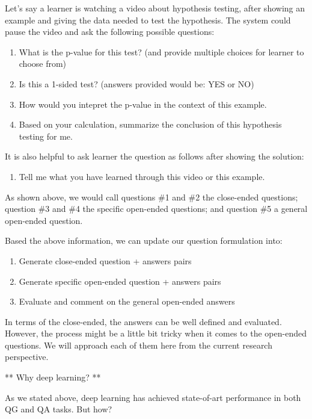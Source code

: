 \documentclass[]{book}
\providecommand{\tightlist}{%
  \setlength{\itemsep}{0pt}\setlength{\parskip}{0pt}}
\theoremstyle{definition}
\theoremstyle{definition}
\theoremstyle{definition}
\theoremstyle{remark}
\begin{document}
Let's say a learner is watching a video about hypothesis testing, after
showing an example and giving the data needed to test the hypothesis.
The system could pause the video and ask the following possible
questions:

\begin{enumerate}
\def\labelenumi{\arabic{enumi}.}
\item
  What is the p-value for this test? (and provide multiple choices for
  learner to choose from)
\item
  Is this a 1-sided test? (answers provided would be: YES or NO)
\item
  How would you intepret the p-value in the context of this example.
\item
  Based on your calculation, summarize the conclusion of this hypothesis
  testing for me.
\end{enumerate}

It is also helpful to ask learner the question as follows after showing
the solution:

\begin{enumerate}
\def\labelenumi{\arabic{enumi}.}
\setcounter{enumi}{4}
\tightlist
\item
  Tell me what you have learned through this video or this example.
\end{enumerate}

As shown above, we would call questions \#1 and \#2 the close-ended
questions; question \#3 and \#4 the specific open-ended questions; and
question \#5 a general open-ended question.

Based the above information, we can update our question formulation
into:

\begin{enumerate}
\def\labelenumi{\arabic{enumi}.}
\item
  Generate close-ended question + answers pairs
\item
  Generate specific open-ended question + answers pairs
\item
  Evaluate and comment on the general open-ended answers
\end{enumerate}

In terms of the close-ended, the answers can be well defined and
evaluated. However, the process might be a little bit tricky when it
comes to the open-ended questions. We will approach each of them here
from the current research perspective.

** Why deep learning? **

As we stated above, deep learning has achieved state-of-art performance
in both QG and QA tasks. But how?
\end{document}
